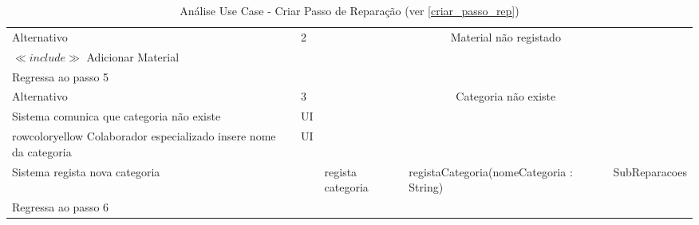 \documentclass[../relatorio.tex]{subfiles}
\begin{document}
\begin{landscape}
\begin{table}[!h]
\begin{tabular}{|p{5cm}|p{1cm}|p{4cm}|p{6cm}|p{3cm}|}
                     & 
            \\
            \hline
            \rowcolor{green!30}
            Alternativo  & 2                                                 &  \multicolumn{3}{c}{Material não registado}\\
            \hline
            $\ll include \gg$ Adicionar Material
                     & 
                     & 
                     & 
                     & 
            \\
            \hline
            Regressa ao passo 5
                     & 
                     & 
                     & 
                     & 
            \\
            \hline
            \rowcolor{green!30}
            Alternativo  & 3                                                &  \multicolumn{3}{c}{Categoria não existe}\\
            \hline
            \rowcolor{yellow}
            Sistema comunica que categoria não existe 
                     & UI
                     & 
                     & 
                     & 
            \\
            \hline
            rowcolor{yellow}
            Colaborador especializado insere nome da categoria 
                     & UI
                     & 
                     & 
                     & 
            \\
            \hline
            Sistema regista nova categoria
                     & 
                     & regista categoria 
                     & registaCategoria(nomeCategoria : String)
                     & SubReparacoes
            \\
            \hline
            Regressa ao passo 6
                     & 
                     & 
                     & 
                     & 
            \\
            \hline
        \end{tabular}
        \caption{Análise Use Case - Criar Passo de Reparação (ver \ref{criar_passo_rep})}
    \end{table}
\end{landscape}
\end{document}
